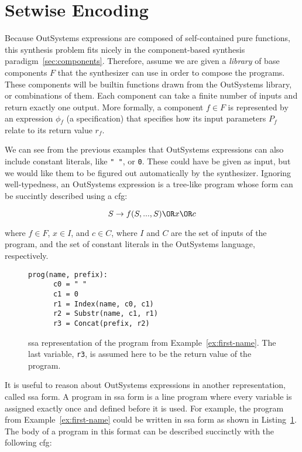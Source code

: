 \section{Setwise Encoding}
\label{sec:setwise-encoding}

Because OutSystems expressions are composed of self-contained pure functions,
this synthesis problem fits nicely in the component-based synthesis
paradigm~\ref{sec:components}. Therefore, assume we are given a \textit{library}
of base components $F$ that the synthesizer can use in order to compose the
programs. These components will be builtin functions drawn from the OutSystems
library, or combinations of them. Each component can take a finite number of
inputs and return exactly one output. More formally, a component $f \in F$ is
represented by an expression $\phi{}_f$ (a specification) that specifies how its
input parameters $P_f$ relate to its return value $r_f$.

We can see from the previous examples that OutSystems expressions can also
include constant literals, like \lstinline{" "}, or \lstinline{0}. These could
have be given as input, but we would like them to be figured out automatically
by the synthesizer. Ignoring well-typedness, an OutSystems expression is a
tree-like program whose form can be succintly described using a \gls{cfg}:

\[S \rightarrow f(S, ..., S) \OR x \OR c\]

\noindent
where $f \in F$, $x \in I$, and $c \in C$, where $I$ and $C$ are the set of
inputs of the program, and the set of constant literals in the OutSystems
language, respectively.

\begin{figure}
  \begin{lstlisting}[frame=tlrb]
    prog(name, prefix):
      c0 = " "
      c1 = 0
      r1 = Index(name, c0, c1)
      r2 = Substr(name, c1, r1)
      r3 = Concat(prefix, r2)
  \end{lstlisting}
\caption{\gls{ssa} representation of the program from
    Example~\ref{ex:first-name}. The last variable, \lstinline{r3}, is assumed
    here to be the return value of the program.}
\label{fig:first-name-ssa}
\end{figure}

It is useful to reason about OutSystems expressions in another representation,
called \gls{ssa} form. A program in \gls{ssa} form is a line program where every
variable is assigned exactly once and defined before it is used. For example,
the program from Example~\ref{ex:first-name} could be written in \gls{ssa} form
as shown in Listing~\ref{fig:first-name-ssa}. The body of a program in this
format can be described succinctly with the following \gls{cfg}:

